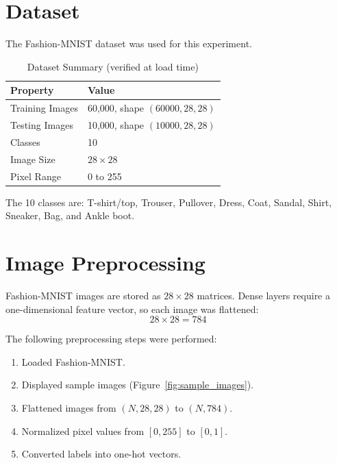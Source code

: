 \documentclass[11pt]{article}
\begin{document}
\section{Dataset}
The Fashion-MNIST dataset was used for this experiment.

\begin{table}[H]
\centering
\caption{Dataset Summary (verified at load time)}
\begin{tabular}{@{}ll@{}}
\toprule
\textbf{Property} & \textbf{Value} \\
\midrule
Training Images & 60{,}000, shape $(60000, 28, 28)$ \\
Testing Images  & 10{,}000, shape $(10000, 28, 28)$ \\
Classes         & 10 \\
Image Size      & $28 \times 28$ \\
Pixel Range     & 0 to 255 \\
\bottomrule
\end{tabular}
\end{table}

The 10 classes are: T-shirt/top, Trouser, Pullover, Dress, Coat, Sandal, Shirt,
Sneaker, Bag, and Ankle boot.

\section{Image Preprocessing}
Fashion-MNIST images are stored as $28 \times 28$ matrices. Dense layers require a
one-dimensional feature vector, so each image was flattened:
\begin{equation}
    28 \times 28 = 784
\end{equation}

The following preprocessing steps were performed:
\begin{enumerate}[label=\arabic*.]
    \item Loaded Fashion-MNIST.
    \item Displayed sample images (Figure~\ref{fig:sample_images}).
    \item Flattened images from $(N, 28, 28)$ to $(N, 784)$.
    \item Normalized pixel values from $[0, 255]$ to $[0, 1]$.
    \item Converted labels into one-hot vectors.
\end{enumerate}
\end{document}
